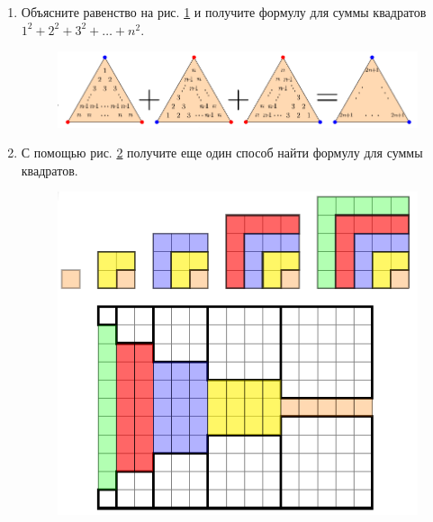 \begin{enumerate}
\item Объясните равенство на рис. \ref{sumquad} и получите формулу для суммы квадратов $1^2+2^2+3^2+\dots+n^2$.
\begin{figure}[hbt!]
\begin{center}
\includegraphics[scale=0.75]{../sumquad.png}
\end{center}
\caption{}\label{sumquad}
\end{figure}

\item С помощью рис. \ref{sumquad2} получите еще один способ найти формулу для суммы квадратов.
\begin{figure}[hbt!]
\begin{center}
\includegraphics[scale=0.6]{../sumquad2.png}
\end{center}
\caption{}\label{sumquad2}
\end{figure}
\end{enumerate}

